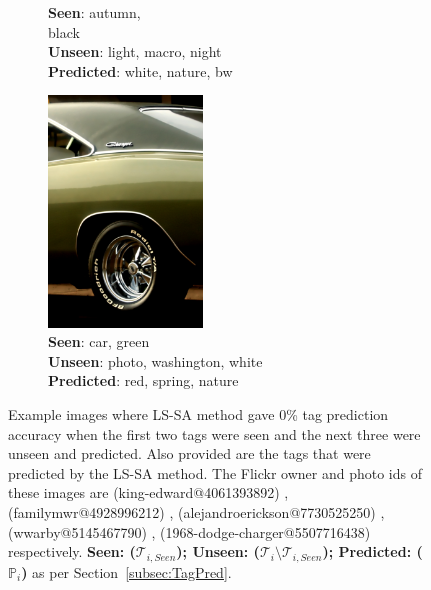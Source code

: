 \begin{figure}
\begin{subfigure}[b]{0.17\textwidth}
                \caption{\textbf{Seen}: autumn, \\ black\\ \textbf{Unseen}: light, macro, night \\ \textbf{Predicted}: white, nature, bw }
                \label{fig:negex4}
        \end{subfigure}%
	\; \vline
        \; %
        \begin{subfigure}[b]{0.18\textwidth}
                \includegraphics[width=0.45\textwidth]{TagTree/Flickrimg/acf2533e-69ac-3e2e-8eab-e024ca9682fd.jpeg}
                \caption{\textbf{Seen}: car, green \\ \textbf{Unseen}: photo, washington, white \\ \textbf{Predicted}: red, spring, nature }
                \label{fig:negex5}
        \end{subfigure}
        \caption[Example images where LS-SA method gave 0\% tag prediction accuracy when the first two tags were seen and the next three were unseen and predicted. ]{Example images where LS-SA method gave 0\% tag prediction accuracy when the first two tags were seen and the next three were unseen and predicted. Also provided are the tags that were predicted by the LS-SA method. The Flickr owner and photo ids of these images
are (king-edward@4061393892) , (familymwr@4928996212) , (alejandroerickson@7730525250) , (wwarby@5145467790) ,  (1968-dodge-charger@5507716438)  respectively. \textbf{Seen: ($\mathcal{T}_{i,Seen}$); Unseen: ($\mathcal{T}_i \setminus  \mathcal{T}_{i,Seen}$); Predicted: ($\mathbb{P}_i$)} as per Section~\ref{subsec:TagPred}. }  \label{fig:negativeExs}
\end{figure}
